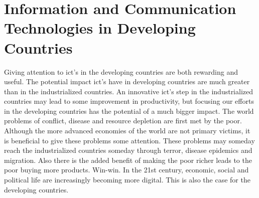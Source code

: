 \section{Information and Communication Technologies in Developing Countries}
Giving attention to \gls{ict}'s in the developing countries are both rewarding and useful. 
The potential impact \gls{ict}'s have in developing countries are much greater than in the industrialized countries. 
An innovative \gls{ict}'s step in the industrialized countries may lead to some improvement in productivity, but focusing our efforts in the developing countries has the potential of a much bigger impact.
The world problems of conflict, disease and resource depletion are first met by the poor. 
Although the more advanced economies of the world are not primary victims, it is beneficial to give these problems some attention.
These problems may someday reach the industrialized countries someday through terror, disease epidemics and migration. 
Also there is the added benefit of making the poor richer leads to the poor buying more products. Win-win.
In the 21st century, economic, social and political life are increasingly becoming more digital. 
This is also the case for the developing countries. 

